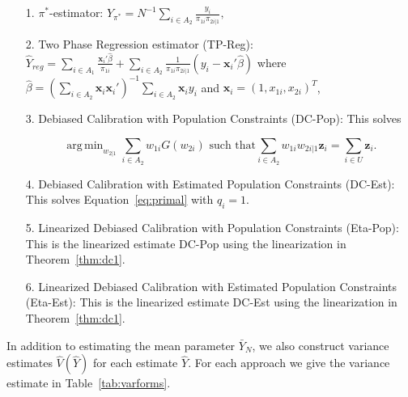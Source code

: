 \documentclass[12pt]{article}
\DeclareMathOperator*{\argmin}{arg\,min}
\renewcommand{\bf}[1]{\mathbf{#1}}
\begin{document}
\begin{itemize}
  \item[1.] $\pi^*$-estimator: $\hat Y_{\pi^*} = N^{-1} \sum_{i \in A_2}
    \frac{y_i}{\pi_{1i} \pi_{2i|1}},$
  \item[2.] Two Phase Regression estimator (TP-Reg): 
    $\hat Y_{reg} = \sum_{i \in A_1} \frac{\bf x_i' \hat \beta}{\pi_{1i}} + 
    \sum_{i \in A_2} \frac{1}{\pi_{1i}\pi_{2i|1}}(y_i - \bf x_i' \hat \beta)$ 
    where $\hat \beta = 
    \left(\sum_{i \in A_2} \bf x_i \bf x_i'\right)^{-1} \sum_{i \in A_2} \bf x_i y_i$
    and $\bf x_i = (1, x_{1i}, x_{2i})^T$,

  \item[3.] Debiased Calibration with Population Constraints (DC-Pop): This 
    solves 

  \begin{equation}
    \argmin_{w_{2|1}} \sum_{i \in A_2} w_{1i} G(w_{2i}) \text{ such that}
    \sum_{i \in A_2} w_{1i} w_{2i|1} \bf z_i = \sum_{i \in U} \bf z_i.
  \end{equation}

  \item[4.] Debiased Calibration with Estimated Population Constraints (DC-Est):
    This solves Equation~\eqref{eq:primal} with $q_i = 1$.
  \item[5.] Linearized Debiased Calibration with Population Constraints (Eta-Pop):
    This is the linearized estimate DC-Pop using the linearization in
    Theorem~\ref{thm:dc1}.
  \item[6.] Linearized Debiased Calibration with Estimated Population
    Constraints (Eta-Est): This is the linearized estimate DC-Est using the
    linearization in Theorem~\ref{thm:dc1}.
\end{itemize}

In addition to estimating the mean parameter $\bar Y_N$, we also construct
variance estimates $\hat V(\hat Y)$ for each estimate $\hat Y$. For each
approach we give the variance estimate in Table~\ref{tab:varforms}.
\end{document}
